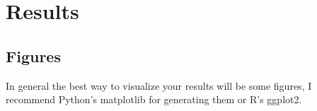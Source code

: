 \documentclass[11pt,letterpaper]{article}
\begin{document}


\section{Results} %
\label{sec:results}

\subsection{Figures} %
\label{sub:figures}

\begin{tip}
In general the best way to visualize your results will be some figures, I recommend Python's matplotlib for generating them or R's ggplot2.
\end{tip}
\end{document}
